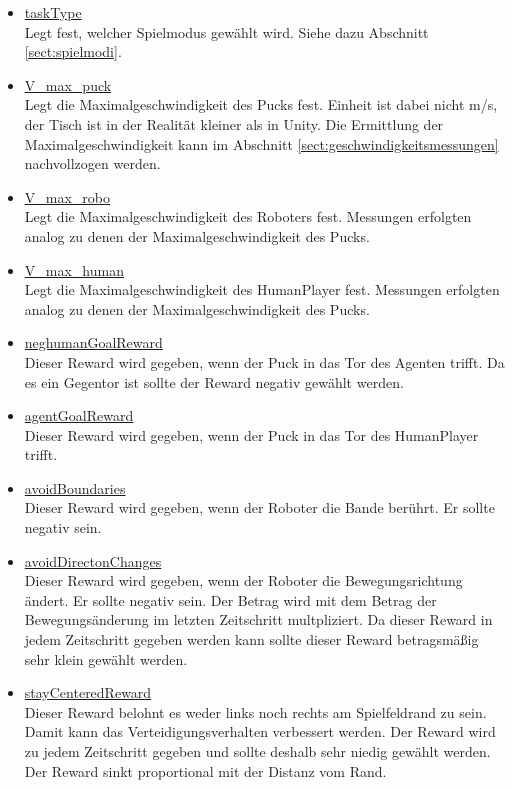 \begin{itemize}
\item \underline{taskType} \\
Legt fest, welcher Spielmodus gewählt wird. Siehe dazu Abschnitt \ref{sect:spielmodi}.

\item \underline{V\_max\_puck} \\
Legt die Maximalgeschwindigkeit des Pucks fest. Einheit ist dabei nicht m/s, der Tisch ist in der Realität kleiner als in Unity. Die Ermittlung der Maximalgeschwindigkeit kann im Abschnitt \ref{sect:geschwindigkeitsmessungen} nachvollzogen werden.

\item \underline{V\_max\_robo} \\
Legt die Maximalgeschwindigkeit des Roboters fest. Messungen erfolgten analog zu denen der Maximalgeschwindigkeit des Pucks.

\item \underline{V\_max\_human} \\
Legt die Maximalgeschwindigkeit des HumanPlayer fest. Messungen erfolgten analog zu denen der Maximalgeschwindigkeit des Pucks.

\item \underline{neghumanGoalReward} \\
Dieser Reward wird gegeben, wenn der Puck in das Tor des Agenten trifft. Da es ein Gegentor ist sollte der Reward negativ gewählt werden.

\item \underline{agentGoalReward} \\
Dieser Reward wird gegeben, wenn der Puck in das Tor des HumanPlayer trifft. 

\item \underline{avoidBoundaries} \\
Dieser Reward wird gegeben, wenn der Roboter die Bande berührt. Er sollte negativ sein. 

\item \underline{avoidDirectonChanges} \\
Dieser Reward wird gegeben, wenn der Roboter die Bewegungsrichtung ändert. Er sollte negativ sein. Der Betrag wird mit dem Betrag der Bewegungsänderung im letzten Zeitschritt multpliziert. Da dieser Reward in jedem Zeitschritt gegeben werden kann sollte dieser Reward betragsmäßig sehr klein gewählt werden.

\item \underline{stayCenteredReward} \\
Dieser Reward belohnt es weder links noch rechts am Spielfeldrand zu sein. Damit kann das Verteidigungsverhalten verbessert werden. Der Reward wird zu jedem Zeitschritt gegeben und sollte deshalb sehr niedig gewählt werden. Der Reward sinkt proportional mit der Distanz vom Rand.


\end{itemize}
